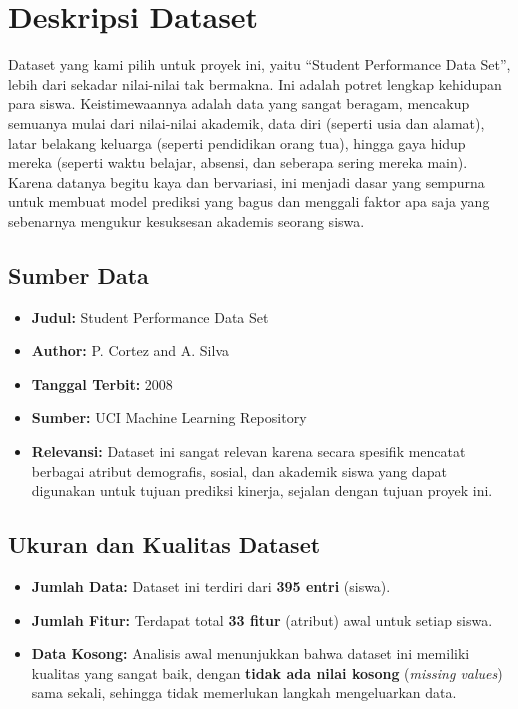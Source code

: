 \section{Deskripsi Dataset}
Dataset yang kami pilih untuk proyek ini, yaitu ``Student Performance Data Set'', lebih dari sekadar nilai-nilai tak bermakna. Ini adalah potret lengkap kehidupan para siswa. Keistimewaannya adalah data yang sangat beragam, mencakup semuanya mulai dari nilai-nilai akademik, data diri (seperti usia dan alamat), latar belakang keluarga (seperti pendidikan orang tua), hingga gaya hidup mereka (seperti waktu belajar, absensi, dan seberapa sering mereka main). Karena datanya begitu kaya dan bervariasi, ini menjadi dasar yang sempurna untuk membuat model prediksi yang bagus dan menggali faktor apa saja yang sebenarnya mengukur kesuksesan akademis seorang siswa.

\subsection{Sumber Data}
\begin{itemize}
    \item \textbf{Judul:} Student Performance Data Set
    \item \textbf{Author:} P. Cortez and A. Silva
    \item \textbf{Tanggal Terbit:} 2008
    \item \textbf{Sumber:} UCI Machine Learning Repository
    \item \textbf{Relevansi:} Dataset ini sangat relevan karena secara spesifik mencatat berbagai atribut demografis, sosial, dan akademik siswa yang dapat digunakan untuk tujuan prediksi kinerja, sejalan dengan tujuan proyek ini.
\end{itemize}

\subsection{Ukuran dan Kualitas Dataset}
\begin{itemize}
    \item \textbf{Jumlah Data:} Dataset ini terdiri dari \textbf{395 entri} (siswa).
    \item \textbf{Jumlah Fitur:} Terdapat total \textbf{33 fitur} (atribut) awal untuk setiap siswa.
    \item \textbf{Data Kosong:} Analisis awal menunjukkan bahwa dataset ini memiliki kualitas yang sangat baik, dengan \textbf{tidak ada nilai kosong} (\textit{missing values}) sama sekali, sehingga tidak memerlukan langkah mengeluarkan data.
\end{itemize}

